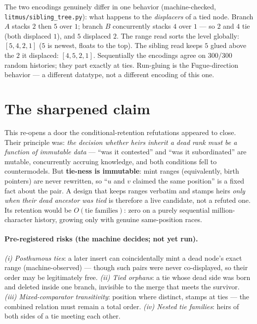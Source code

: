 \documentclass[11pt]{article}
\begin{document}
The two encodings genuinely differ in one behavior (machine-checked,
\texttt{litmus/sibling\_tree.py}): what happens to the
\emph{displacers} of a tied node. Branch $A$ stacks $2$ then $5$ over
$1$; branch $B$ concurrently stacks $4$ over $1$ --- so $2$ and $4$ tie
(both displaced $1$), and $5$ displaced $2$. The range read sorts the
level globally: $[5, 4, 2, 1]$ ($5$ is newest, floats to the top). The
sibling read keeps $5$ glued above the $2$ it displaced: $[4, 5, 2, 1]$.
Sequentially the encodings agree on 300/300 random histories; they part
exactly at ties. Run-gluing is the Fugue-direction behavior --- a
different datatype, not a different encoding of this one.

\section{The sharpened claim}

\begin{center}
\end{center}

\medskip
\noindent This re-opens a door the conditional-retention refutations
appeared to close. Their principle was: \emph{the decision whether heirs
inherit a dead rank must be a function of immutable data} --- ``was it
contested'' and ``was it subordinated'' are mutable, concurrently
accruing knowledge, and both conditions fell to countermodels. But
\textbf{tie-ness is immutable}: mint ranges (equivalently, birth
pointers) are never rewritten, so ``$u$ and $v$ claimed the same
position'' is a fixed fact about the pair. A design that keeps ranges
verbatim and stamps heirs \emph{only when their dead ancestor was tied}
is therefore a live candidate, not a refuted one. Its retention would be
$O(\text{tie families})$: zero on a purely sequential million-character
history, growing only with genuine same-position races.

\paragraph{Pre-registered risks (the machine decides; not yet run).}
\emph{(i) Posthumous ties}: a later insert can coincidentally mint a
dead node's exact range (machine-observed) --- though such pairs were
never co-displayed, so their order may be legitimately free. \emph{(ii)
Tied orphans}: a tie whose dead side was born and deleted inside one
branch, invisible to the merge that meets the survivor. \emph{(iii)
Mixed-comparator transitivity}: position where distinct, stamps at ties
--- the combined relation must remain a total order. \emph{(iv) Nested
tie families}: heirs of both sides of a tie meeting each other.
\end{document}
